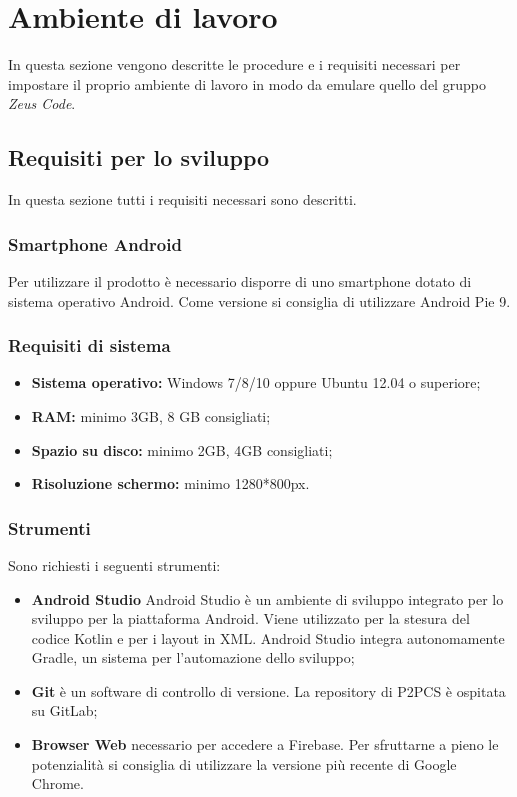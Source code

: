 \section{Ambiente di lavoro}
In questa sezione vengono descritte le procedure e i requisiti necessari per impostare il proprio ambiente di lavoro in modo da emulare quello del gruppo \textit{Zeus Code}.  
\subsection{Requisiti per lo sviluppo}
In questa sezione tutti i requisiti necessari sono descritti.
\subsubsection{Smartphone Android}
Per utilizzare il prodotto è necessario disporre di uno smartphone dotato di sistema operativo Android. Come versione si consiglia di utilizzare Android Pie 9.
\subsubsection{Requisiti di sistema}
\begin{itemize}
	\item \textbf{Sistema operativo:} Windows 7/8/10 oppure Ubuntu 12.04 o superiore;
	\item \textbf{RAM:} minimo 3GB, 8 GB consigliati;
	\item \textbf{Spazio su disco:} minimo 2GB, 4GB consigliati;
	\item \textbf{Risoluzione schermo:} minimo 1280*800px.
\end{itemize}
\subsubsection{Strumenti}
Sono richiesti i seguenti strumenti:
\begin{itemize}
	\item \textbf{Android Studio} Android Studio è un ambiente di sviluppo integrato per lo sviluppo per la piattaforma Android. Viene utilizzato per la stesura del codice Kotlin e per i layout in XML. Android Studio integra autonomamente Gradle, un sistema per l'automazione dello sviluppo;
	\item \textbf{Git} è un software di controllo di versione. La repository di P2PCS è ospitata su GitLab;
	\item \textbf{Browser Web} necessario per accedere a Firebase. Per sfruttarne a pieno le potenzialità si consiglia di utilizzare la versione più recente di Google Chrome.
\end{itemize}
